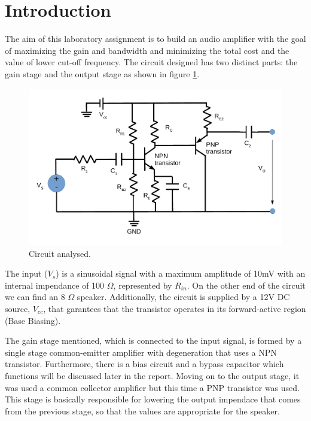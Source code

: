 \clearpage

\vspace{-0.25cm}
\section{Introduction}
\label{sec:introduction}

The aim of this laboratory assignment is to build an audio amplifier with the goal
of maximizing the gain and bandwidth and minimizing the total cost and the value of lower cut-off frequency.
The circuit designed has two distinct parts: the gain stage and the output stage as shown in figure \ref{fig:circuito}.

\begin{figure}[h] \centering
    \includegraphics[scale=0.7]{lab4_principal.pdf}
    \caption{Circuit analysed.}
    \label{fig:circuito}
\end{figure}

The input ($V_{s}$) is a sinusoidal signal with a maximum amplitude of 10mV with an internal impendance of 100 $\Omega$, represented by $R_{in}$.
On the other end of the circuit we can find an 8 $\Omega$ speaker. Additionally, the circuit is supplied
by a 12V DC source, $V_{cc}$, that garantees that the transistor operates in its forward-active region (Base Biasing).

The gain stage mentioned, which is connected to the input signal, is formed by a single stage common-emitter amplifier
with degeneration that uses a NPN transistor. Furthermore, there is a bias circuit and a bypass capacitor which
functions will be discussed later in the report.
Moving on to the output stage, it was used a common collector amplifier but this time a PNP transistor was used.
This stage is basically responsible for lowering the output impendace that comes from the previous stage,
so that the values are appropriate for the speaker.

